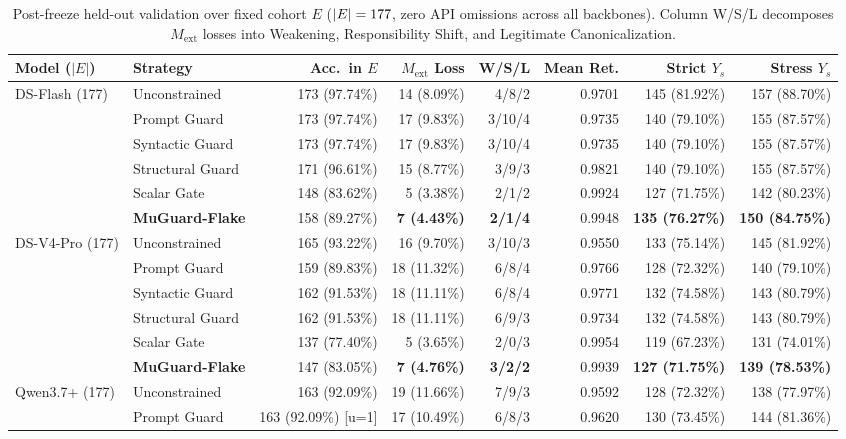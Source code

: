 \begin{table}[t]
\centering
\scriptsize
\setlength{\tabcolsep}{1.6pt}
\caption{Post-freeze held-out validation over fixed cohort $E$ ($|E| = 177$, zero API omissions across all backbones). Column W/S/L decomposes $M_{\text{ext}}$ losses into Weakening, Responsibility Shift, and Legitimate Canonicalization.}
\label{tab:k5_heldout}
\begin{tabular}{llrrrrrr}
\toprule
Model ($|E|$) & Strategy & Acc.\ in $E$ & $M_{\text{ext}}$ Loss & W/S/L & Mean Ret. & Strict $Y_s$ & Stress $Y_s$ \\
\midrule
DS-Flash (177) & Unconstrained & 173 (97.74\%) & 14 (8.09\%) & 4/8/2 & 0.9701 & 145 (81.92\%) & 157 (88.70\%) \\
 & Prompt Guard & 173 (97.74\%) & 17 (9.83\%) & 3/10/4 & 0.9735 & 140 (79.10\%) & 155 (87.57\%) \\
 & Syntactic Guard & 173 (97.74\%) & 17 (9.83\%) & 3/10/4 & 0.9735 & 140 (79.10\%) & 155 (87.57\%) \\
 & Structural Guard & 171 (96.61\%) & 15 (8.77\%) & 3/9/3 & 0.9821 & 140 (79.10\%) & 155 (87.57\%) \\
 & Scalar Gate & 148 (83.62\%) & 5 (3.38\%) & 2/1/2 & 0.9924 & 127 (71.75\%) & 142 (80.23\%) \\
 & \textbf{MuGuard-Flake} & 158 (89.27\%) & \textbf{7 (4.43\%)} & \textbf{2/1/4} & 0.9948 & \textbf{135 (76.27\%)} & \textbf{150 (84.75\%)} \\
\midrule
DS-V4-Pro (177) & Unconstrained & 165 (93.22\%) & 16 (9.70\%) & 3/10/3 & 0.9550 & 133 (75.14\%) & 145 (81.92\%) \\
 & Prompt Guard & 159 (89.83\%) & 18 (11.32\%) & 6/8/4 & 0.9766 & 128 (72.32\%) & 140 (79.10\%) \\
 & Syntactic Guard & 162 (91.53\%) & 18 (11.11\%) & 6/8/4 & 0.9771 & 132 (74.58\%) & 143 (80.79\%) \\
 & Structural Guard & 162 (91.53\%) & 18 (11.11\%) & 6/9/3 & 0.9734 & 132 (74.58\%) & 143 (80.79\%) \\
 & Scalar Gate & 137 (77.40\%) & 5 (3.65\%) & 2/0/3 & 0.9954 & 119 (67.23\%) & 131 (74.01\%) \\
 & \textbf{MuGuard-Flake} & 147 (83.05\%) & \textbf{7 (4.76\%)} & \textbf{3/2/2} & 0.9939 & \textbf{127 (71.75\%)} & \textbf{139 (78.53\%)} \\
\midrule
Qwen3.7+ (177) & Unconstrained & 163 (92.09\%) & 19 (11.66\%) & 7/9/3 & 0.9592 & 128 (72.32\%) & 138 (77.97\%) \\
 & Prompt Guard & 163 (92.09\%) [u=1] & 17 (10.49\%) & 6/8/3 & 0.9620 & 130 (73.45\%) & 144 (81.36\%) \\

\end{tabular}
\end{table}
